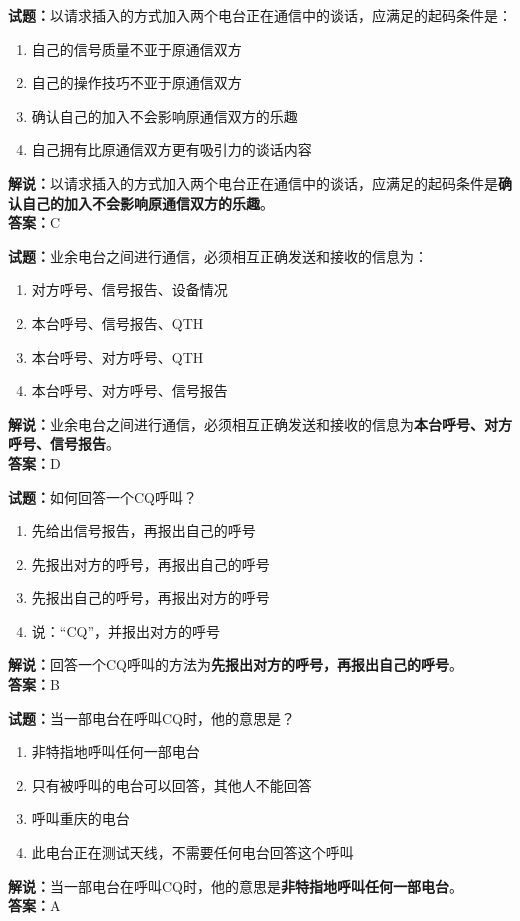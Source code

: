 \documentclass{ctexbook}
\begin{document}
\bigskip

\noindent\textbf{试题：}以请求插入的方式加入两个电台正在通信中的谈话，应满足的起码条件是：
\begin{enumerate}[leftmargin=3em]
  \item 自己的信号质量不亚于原通信双方
  \item 自己的操作技巧不亚于原通信双方
  \item 确认自己的加入不会影响原通信双方的乐趣
  \item 自己拥有比原通信双方更有吸引力的谈话内容
\end{enumerate}
\noindent\textbf{解说：}以请求插入的方式加入两个电台正在通信中的谈话，应满足的起码条件是\textbf{确认自己的加入不会影响原通信双方的乐趣}。\\\noindent\textbf{答案：}C

\bigskip

\noindent\textbf{试题：}业余电台之间进行通信，必须相互正确发送和接收的信息为：
\begin{enumerate}[leftmargin=3em]
  \item 对方呼号、信号报告、设备情况
  \item 本台呼号、信号报告、QTH
  \item 本台呼号、对方呼号、QTH
  \item 本台呼号、对方呼号、信号报告
\end{enumerate}
\noindent\textbf{解说：}业余电台之间进行通信，必须相互正确发送和接收的信息为\textbf{本台呼号、对方呼号、信号报告}。\\\noindent\textbf{答案：}D

\bigskip

\noindent\textbf{试题：}如何回答一个CQ呼叫？
\begin{enumerate}[leftmargin=3em]
  \item 先给出信号报告，再报出自己的呼号
  \item 先报出对方的呼号，再报出自己的呼号
  \item 先报出自己的呼号，再报出对方的呼号
  \item 说：“CQ”，并报出对方的呼号
\end{enumerate}
\noindent\textbf{解说：}回答一个CQ呼叫的方法为\textbf{先报出对方的呼号，再报出自己的呼号}\cite{yeyuwuxiandiantongxin}。\\
\noindent\textbf{答案：}B

\bigskip

\noindent\textbf{试题：}当一部电台在呼叫CQ时，他的意思是？
\begin{enumerate}[leftmargin=3em]
  \item 非特指地呼叫任何一部电台
  \item 只有被呼叫的电台可以回答，其他人不能回答
  \item 呼叫重庆的电台
  \item 此电台正在测试天线，不需要任何电台回答这个呼叫
\end{enumerate}
\noindent\textbf{解说：}当一部电台在呼叫CQ时，他的意思是\textbf{非特指地呼叫任何一部电台}。\\\noindent\textbf{答案：}A
\end{document}
